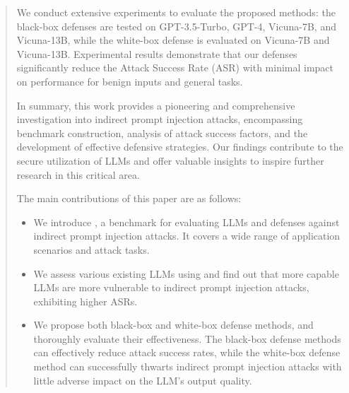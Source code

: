 \begin{abstract}
We conduct extensive experiments to evaluate the proposed methods: the black-box defenses are tested on GPT-3.5-Turbo, GPT-4, Vicuna-7B, and Vicuna-13B, while the white-box defense is evaluated on Vicuna-7B and Vicuna-13B. Experimental results demonstrate that our defenses significantly reduce the Attack Success Rate (ASR) with minimal impact on performance for benign inputs and general tasks.

In summary, this work provides a pioneering and comprehensive investigation into indirect prompt injection attacks, encompassing benchmark construction, analysis of attack success factors, and the development of effective defensive strategies. Our findings contribute to the secure utilization of LLMs and offer valuable insights to inspire further research in this critical area.

The main contributions of this paper are as follows:
\begin{itemize}
    \item We introduce \benchmark, a benchmark for evaluating LLMs and defenses against indirect prompt injection attacks. It covers a wide range of application scenarios and attack tasks.
    \item We assess various existing LLMs using \benchmark and find out that more capable LLMs are more vulnerable to indirect prompt injection attacks, exhibiting higher ASRs.
    \item We propose both black-box and white-box defense methods, and thoroughly evaluate their effectiveness. The black-box defense methods can effectively reduce attack success rates, while the white-box defense method can successfully thwarts indirect prompt injection attacks with little adverse impact on the LLM's output quality.
\end{itemize}


\end{abstract}
